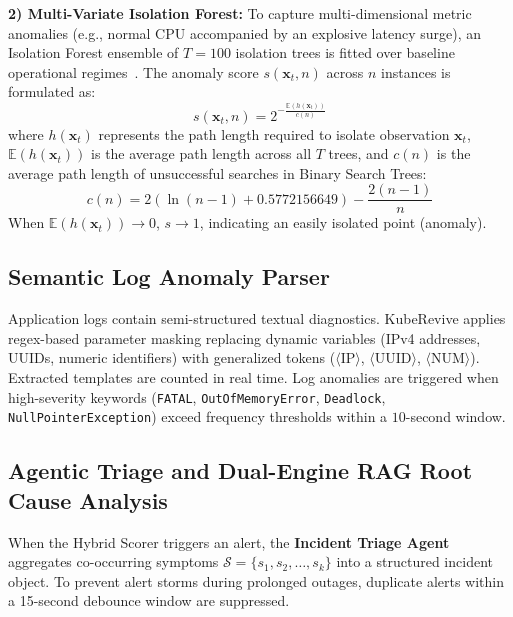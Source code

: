 \documentclass[conference]{IEEEtran}
\begin{document}
\textbf{2) Multi-Variate Isolation Forest:}
To capture multi-dimensional metric anomalies (e.g., normal CPU accompanied by an explosive latency surge), an Isolation Forest ensemble of $T=100$ isolation trees is fitted over baseline operational regimes~\cite{isolation_forest}. The anomaly score $s(\mathbf{x}_t, n)$ across $n$ instances is formulated as:
\begin{equation}
s(\mathbf{x}_t, n) = 2^{-\frac{\mathbb{E}(h(\mathbf{x}_t))}{c(n)}}
\end{equation}
where $h(\mathbf{x}_t)$ represents the path length required to isolate observation $\mathbf{x}_t$, $\mathbb{E}(h(\mathbf{x}_t))$ is the average path length across all $T$ trees, and $c(n)$ is the average path length of unsuccessful searches in Binary Search Trees:
\begin{equation}
c(n) = 2\left(\ln(n - 1) + 0.5772156649\right) - \frac{2(n - 1)}{n}
\end{equation}
When $\mathbb{E}(h(\mathbf{x}_t)) \to 0$, $s \to 1$, indicating an easily isolated point (anomaly).

\subsection{Semantic Log Anomaly Parser}
Application logs contain semi-structured textual diagnostics. KubeRevive applies regex-based parameter masking replacing dynamic variables (IPv4 addresses, UUIDs, numeric identifiers) with generalized tokens ($\langle\text{IP}\rangle$, $\langle\text{UUID}\rangle$, $\langle\text{NUM}\rangle$). Extracted templates are counted in real time. Log anomalies are triggered when high-severity keywords (\texttt{FATAL}, \texttt{OutOfMemoryError}, \texttt{Deadlock}, \texttt{NullPointerException}) exceed frequency thresholds within a $10$-second window.

\subsection{Agentic Triage and Dual-Engine RAG Root Cause Analysis}
When the Hybrid Scorer triggers an alert, the \textbf{Incident Triage Agent} aggregates co-occurring symptoms $\mathcal{S} = \{s_1, s_2, \dots, s_k\}$ into a structured incident object. To prevent alert storms during prolonged outages, duplicate alerts within a 15-second debounce window are suppressed.
\end{document}
